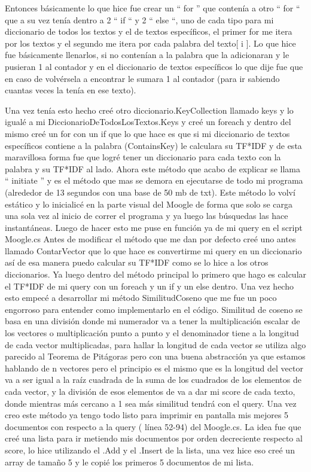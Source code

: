 \documentclass[a4paper,12pt]{article}
\begin{document}
 
Entonces básicamente lo que hice fue crear un “ for ” que contenía a otro “ for “ que a su vez tenía dentro a 2 “ if “ y 2 “ else “, uno de cada tipo para mi diccionario de todos los textos y el de textos específicos, el primer for me itera  por los textos y el segundo me itera por cada palabra del texto[ i ]. 
Lo que hice fue básicamente llenarlos, si no contenían a la palabra que la adicionaran y le pusieran 1 al contador y en el diccionario de textos específicos lo que dije fue que en caso de volvérsela a encontrar le sumara 1 al contador (para ir sabiendo cuantas veces la tenía en ese texto). 
 
Una vez tenía esto hecho creé otro diccionario.KeyCollection llamado keys y lo igualé a mi DiccionarioDeTodosLosTextos.Keys y creé un foreach y dentro del mismo creé un for con un if que lo que hace es que si mi diccionario de textos específicos contiene a la palabra (ContainsKey) le calculara su TF*IDF y de esta maravillosa forma fue que logré tener un diccionario para cada texto con la palabra y su TF*IDF al lado. 
Ahora este método que acabo de explicar se llama “ initiate ” y es el método que mas se demora en ejecutarse de todo mi programa (alrededor de 13 segundos con una base de 50 mb de txt). Este método lo volví estático y lo inicialicé en la parte visual del Moogle de forma que solo se carga una sola vez al inicio de correr el programa y ya luego las búsquedas las hace instantáneas.  
Luego de hacer esto me puse en función ya de mi query en el script Moogle.cs 
Antes de modificar el método que me dan por defecto creé uno antes llamado ContarVector que lo que hace es convertirme mi query en un diccionario así de esa manera puedo calcular su TF*IDF como se lo hice a los otros diccionarios.  
Ya luego dentro del método principal lo primero que hago es calcular el TF*IDF de mi query con un foreach y un if y un else dentro. 
Una vez hecho esto empecé a desarrollar mi método SimilitudCoseno que me fue un poco engorroso para entender como implementarlo en el código. Similitud de coseno se basa en una división donde mi numerador va a tener la multiplicación escalar de los vectores o  multiplicación punto a punto y el denominador tiene a la longitud de cada vector multiplicadas, para hallar la longitud de cada vector se utiliza algo parecido al Teorema de Pitágoras pero con una buena abstracción ya que estamos hablando de n vectores pero el principio es el mismo que es la longitud del vector va a ser igual a la raíz cuadrada de la suma de los cuadrados de los elementos de cada vector, y la división de esos elementos de va a dar mi score de cada texto, donde mientras más cercano a 1 sea más similitud tendrá con el query. 
Una vez creo este método ya tengo todo listo para imprimir en pantalla mis mejores 5 documentos con respecto a la query ( línea 52-94) del Moogle.cs. La idea fue que creé una lista para ir metiendo mis documentos por orden decreciente respecto al score, lo hice utilizando el .Add y el .Insert de la lista, una vez hice eso creé un array de tamaño 5 y le copié los primeros 5 documentos de mi lista.
\end{document}

